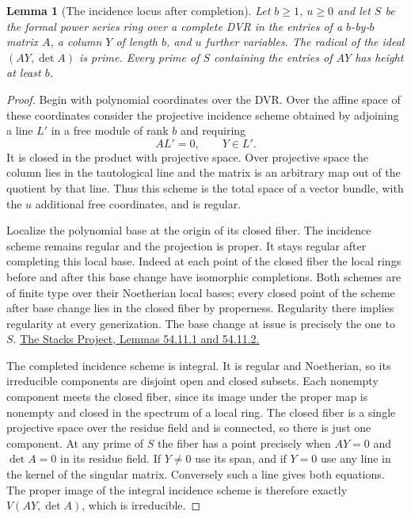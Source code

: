 \documentclass[a4paper,11pt]{article}
\newtheorem{lemma}[proposition]{Lemma}
\theoremstyle{definition}
\theoremstyle{remark}
\numberwithin{equation}{section}
\begin{document}
\begin{lemma}[The incidence locus after completion]\leavevmode
\label{lem:incidence412}
Let \(b\ge1\), \(u\ge0\) and let \(S\) be the formal
power series ring over a complete DVR in the entries of a
\(b\)-by-\(b\) matrix \(A\), a column \(Y\) of length \(b\),
and \(u\) further variables. The radical of the ideal
\((AY,\det A)\) is prime. Every prime of \(S\) containing
the entries of \(AY\) has height at least \(b\).
\end{lemma}
\begin{proof}
Begin with polynomial coordinates over the DVR. Over the
affine space of these coordinates consider the projective
incidence scheme obtained by adjoining a line \(L'\) in a
free module of rank \(b\) and requiring
\[
                       A L'=0,\qquad Y\in L' .
\]
It is closed in the product with projective space. Over
projective space the column lies in the tautological
line and the matrix is an arbitrary map out of the
quotient by that line. Thus this scheme is the total
space of a vector bundle, with the \(u\) additional free
coordinates, and is regular.

Localize the polynomial base at the origin of its closed
fiber. The incidence scheme remains regular and the
projection is proper. It stays regular after completing
this local base. Indeed at each point of the closed fiber
the local rings before and after this base change have
isomorphic completions. Both schemes are of finite type
over their Noetherian local bases; every closed point
of the scheme after base change lies in the closed fiber
by properness. Regularity there implies regularity at
every generization. The base change at issue is precisely
the one to \(S\).
\href{https://stacks.math.columbia.edu/tag/0BG4}
{The Stacks Project, Lemmas 54.11.1 and 54.11.2.}

The completed incidence scheme is integral. It is regular
and Noetherian, so its irreducible components are disjoint
open and closed subsets. Each nonempty component meets
the closed fiber, since its image under the proper map is
nonempty and closed in the spectrum of a local ring. The
closed fiber is a single projective space over the residue
field and is connected, so there is just one component.
At any prime of \(S\) the fiber has a point precisely
when \(AY=0\) and \(\det A=0\) in its residue field.
If \(Y\ne0\) use its span, and if \(Y=0\) use any line
in the kernel of the singular matrix. Conversely such a
line gives both equations. The proper image of the integral
incidence scheme is therefore exactly \(V(AY,\det A)\),
which is irreducible.


\end{proof}
\end{document}
